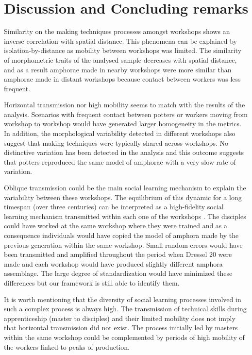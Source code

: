 \documentclass[review]{elsarticle}
\begin{document}
\section{Discussion and Concluding remarks}

Similarity on the making techniques processes amongst workshops shows an inverse correlation with spatial distance. This phenomena can be explained by isolation-by-distance as mobility between workshops was limited. The similarity of morphometric traits of the analysed sample decreases with spatial distance, and as a result amphorae made in nearby workshops were more similar than amphorae made in distant workshops because contact between workers was less frequent. 

Horizontal transmission nor high mobility seems to match with the results of the analysis. Scenarios with frequent contact between potters or workers moving from workshop to workshop would have generated larger homogeneity in the metrics. In addition, the morphological variability detected in different workshops also suggest that making-techniques were typically shared across workshops. No distinctive variation has been detected in the analysis and this outcome suggests that potters reproduced the same model of amphorae with a very slow rate of variation.
  
Oblique transmission could be the main social learning mechanism to explain the variability between these workshops. The equilibrium of this dynamic for a long timespan (over three centuries) can be interpreted as a high-fidelity social learning mechanism transmitted within each one of the workshops \citep{schillinger_copying_2016}. The disciples could have worked at the same workshop where they were trained and as a consequence individuals would have copied the model of amphora made by the previous generation within the same workshop. Small random errors would have been transmitted and amplified throughout the period when Dressel 20 were made and each workshop would have produced slightly different amphora assemblage. The large degree of standardization would have minimized these differences but our framework is still able to identify them. 

It is worth mentioning that the diversity of social learning processes involved in such a complex process is always high. The transmission of technical skills during apprenticeship (master to disciples) and their limited mobility does not imply that horizontal transmission did not exist. The process initially led by masters within the same workshop could be complemented by periods of high mobility of the workers linked to peaks of production.
\end{document}
